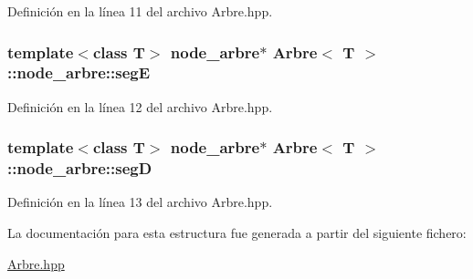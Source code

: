 Definición en la línea 11 del archivo Arbre.\-hpp.

\hypertarget{struct_arbre_1_1node__arbre_add2e7f2ee789db9f38a3bf2d2dd36972}{
\subsubsection[{seg\-E}]{\setlength{\rightskip}{0pt plus 5cm}template$<$class T$>$ {\bf node\-\_\-arbre}$\ast$ {\bf Arbre}$<$ T $>$\-::node\-\_\-arbre\-::seg\-E}}\label{struct_arbre_1_1node__arbre_add2e7f2ee789db9f38a3bf2d2dd36972}


Definición en la línea 12 del archivo Arbre.\-hpp.

\hypertarget{struct_arbre_1_1node__arbre_a9986e206810ba9e519b5b6e590238093}{
\subsubsection[{seg\-D}]{\setlength{\rightskip}{0pt plus 5cm}template$<$class T$>$ {\bf node\-\_\-arbre}$\ast$ {\bf Arbre}$<$ T $>$\-::node\-\_\-arbre\-::seg\-D}}\label{struct_arbre_1_1node__arbre_a9986e206810ba9e519b5b6e590238093}


Definición en la línea 13 del archivo Arbre.\-hpp.



La documentación para esta estructura fue generada a partir del siguiente fichero\-:\begin{DoxyCompactItemize}
\item 
\hyperlink{_arbre_8hpp}{Arbre.\-hpp}\end{DoxyCompactItemize}
